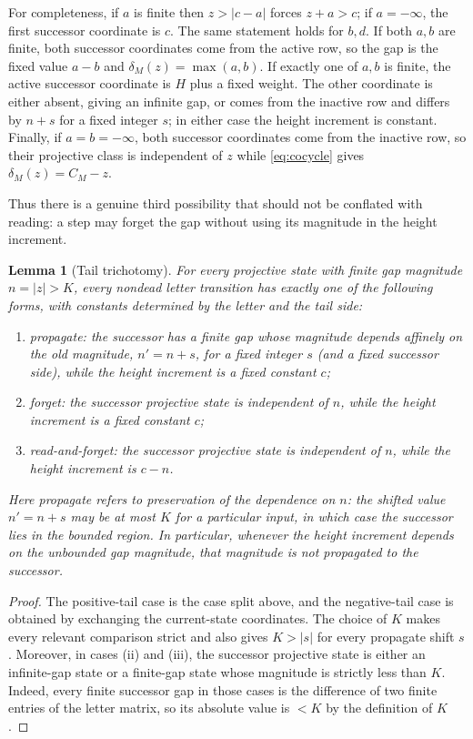 \documentclass[11pt]{article}
\newtheorem{lemma}[theorem]{Lemma}
\newcommand{\minf}{-\infty}
\begin{document}
For completeness, if $a$ is finite then $z>|c-a|$ forces $z+a>c$; if $a=\minf$, the first successor coordinate is $c$. The same statement holds for $b,d$. If both $a,b$ are finite, both successor coordinates come from the active row, so the gap is the fixed value $a-b$ and $\delta_M(z)=\max(a,b)$. If exactly one of $a,b$ is finite, the active successor coordinate is $H$ plus a fixed weight. The other coordinate is either absent, giving an infinite gap, or comes from the inactive row and differs by $n+s$ for a fixed integer $s$; in either case the height increment is constant. Finally, if $a=b=\minf$, both successor coordinates come from the inactive row, so their projective class is independent of $z$ while \eqref{eq:cocycle} gives $\delta_M(z)=C_M-z$.

Thus there is a genuine third possibility that should not be conflated with reading: a step may forget the gap without using its magnitude in the height increment.

\begin{lemma}[Tail trichotomy]\label{lem:tail}
For every projective state with finite gap magnitude $n=|z|>K$, every nondead letter transition has exactly one of the following forms, with constants determined by the letter and the tail side:
\begin{enumerate}[label=(\roman*)]
\item \emph{propagate}: the successor has a finite gap whose magnitude depends affinely on the old magnitude, $n'=n+s$, for a fixed integer $s$ (and a fixed successor side), while the height increment is a fixed constant $c$;
\item \emph{forget}: the successor projective state is independent of $n$, while the height increment is a fixed constant $c$;
\item \emph{read-and-forget}: the successor projective state is independent of $n$, while the height increment is $c-n$.
\end{enumerate}
Here \emph{propagate} refers to preservation of the dependence on $n$: the shifted value $n'=n+s$ may be at most $K$ for a particular input, in which case the successor lies in the bounded region. In particular, whenever the height increment depends on the unbounded gap magnitude, that magnitude is not propagated to the successor.
\end{lemma}

\begin{proof}
The positive-tail case is the case split above, and the negative-tail case is obtained by exchanging the current-state coordinates. The choice of $K$ makes every relevant comparison strict and also gives $K>|s|$ for every propagate shift $s$.
Moreover, in cases (ii) and (iii), the successor projective state is either an infinite-gap state or a finite-gap state whose magnitude is strictly less than $K$. Indeed, every finite successor gap in those cases is the difference of two finite entries of the letter matrix, so its absolute value is $<K$ by the definition of $K$.
\end{proof}
\end{document}
